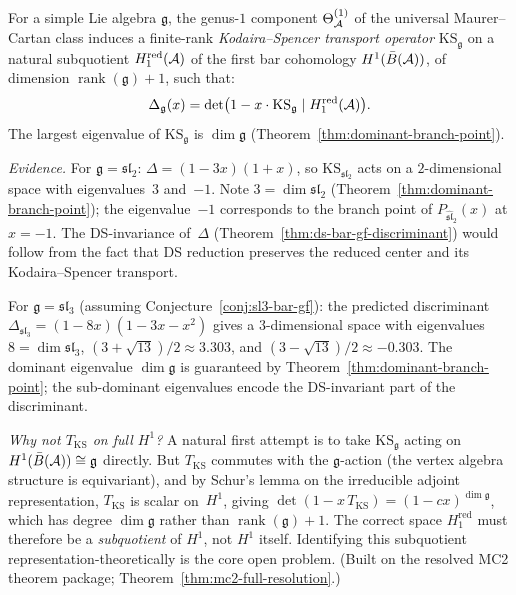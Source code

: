 \begin{conjecture}
\label{conj:discriminant-ks-operator}
For a simple Lie algebra $\mathfrak{g}$, the genus-$1$ component
$\Theta_{\mathcal{A}}^{(1)}$ of the universal Maurer--Cartan class
induces a finite-rank \emph{Kodaira--Spencer transport operator}
$\mathrm{KS}_{\mathfrak{g}}$ on a natural subquotient
$H^{\mathrm{red}}_1(\mathcal{A})$ of the first bar cohomology
$H^1(\bar{B}(\mathcal{A}))$, of dimension
$\operatorname{rank}(\mathfrak{g}) + 1$, such that:
\begin{equation}\label{eq:discriminant-ks-operator}
\Delta_{\mathfrak{g}}(x)
= \det\bigl(1 - x \cdot \mathrm{KS}_{\mathfrak{g}}
  \mid H^{\mathrm{red}}_1(\mathcal{A})\bigr).
\end{equation}
The largest eigenvalue of $\mathrm{KS}_{\mathfrak{g}}$ is
$\dim\mathfrak{g}$ (Theorem~\ref{thm:dominant-branch-point}).

\noindent\emph{Evidence.}
For $\mathfrak{g} = \mathfrak{sl}_2$:
$\Delta = (1-3x)(1+x)$, so
$\mathrm{KS}_{\mathfrak{sl}_2}$
acts on a $2$-dimensional space with eigenvalues~$3$
and~$-1$.  Note $3 = \dim \mathfrak{sl}_2$
(Theorem~\ref{thm:dominant-branch-point}); the
eigenvalue~$-1$ corresponds to the branch point of
$P_{\widehat{\mathfrak{sl}}_2}(x)$ at $x = -1$.
The DS-invariance of~$\Delta$
(Theorem~\ref{thm:ds-bar-gf-discriminant}) would follow
from the fact that DS reduction preserves the reduced center
and its Kodaira--Spencer transport.

For $\mathfrak{g} = \mathfrak{sl}_3$ (assuming
Conjecture~\ref{conj:sl3-bar-gf}):
the predicted discriminant
$\Delta_{\mathfrak{sl}_3} = (1 - 8x)(1 - 3x - x^2)$
gives a $3$-dimensional space with eigenvalues~$8 = \dim \mathfrak{sl}_3$,
$(3 {+} \sqrt{13})/2 \approx 3.303$, and
$(3 {-} \sqrt{13})/2 \approx -0.303$.
The dominant eigenvalue $\dim\mathfrak{g}$ is guaranteed by
Theorem~\ref{thm:dominant-branch-point}; the sub-dominant
eigenvalues encode the DS-invariant part of the discriminant.

\emph{Why not $T_{\mathrm{KS}}$ on full $H^1$?}
A natural first attempt is to take $\mathrm{KS}_{\mathfrak{g}}$
acting on $H^1(\bar{B}(\mathcal{A})) \cong \mathfrak{g}$ directly.
But $T_{\mathrm{KS}}$ commutes with the $\mathfrak{g}$-action
(the vertex algebra structure is equivariant), and by Schur's lemma
on the irreducible adjoint representation, $T_{\mathrm{KS}}$
is scalar on~$H^1$, giving
$\det(1 - x\, T_{\mathrm{KS}}) = (1 - cx)^{\dim\mathfrak{g}}$,
which has degree $\dim\mathfrak{g}$ rather than
$\operatorname{rank}(\mathfrak{g}) + 1$.
The correct space $H^{\mathrm{red}}_1$ must
therefore be a \emph{subquotient} of $H^1$, not $H^1$ itself.
Identifying this subquotient representation-theoretically is the
core open problem.
(Built on the resolved MC2 theorem package; Theorem~\ref{thm:mc2-full-resolution}.)
\end{conjecture}

